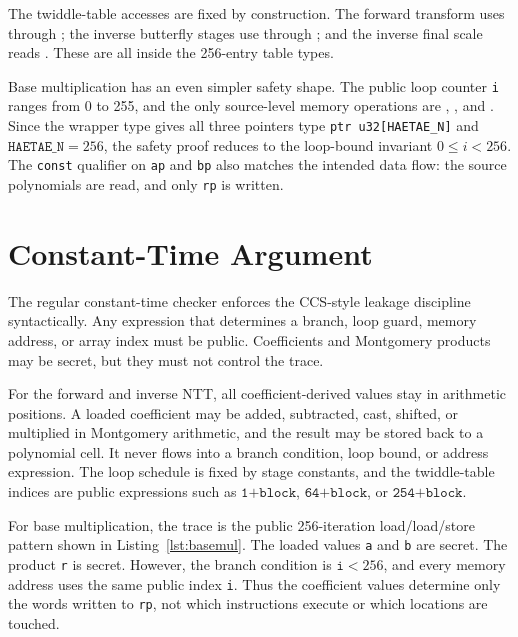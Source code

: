 \documentclass[10pt,twocolumn]{article}
\newcommand{\ct}{constant-time}
\begin{document}
The twiddle-table accesses are fixed by construction.  The forward transform
uses  through ; the inverse butterfly stages
use  through ; and the inverse final
scale reads .  These are all inside the 256-entry table
types.

Base multiplication has an even simpler safety shape.  The public loop counter
\texttt{i} ranges from 0 to 255, and the only source-level memory operations are
, , and .  Since the wrapper type gives all
three pointers type \texttt{ptr u32[HAETAE\_N]} and \(\texttt{HAETAE\_N}=256\),
the safety proof reduces to the loop-bound invariant \(0\leq i<256\).  The
\texttt{const} qualifier on \texttt{ap} and \texttt{bp} also matches the
intended data flow: the source polynomials are read, and only \texttt{rp} is
written.

\section{Constant-Time Argument}

The regular \ct{} checker enforces the CCS-style leakage discipline
syntactically.  Any expression that determines a branch, loop guard, memory
address, or array index must be public.  Coefficients and Montgomery products
may be secret, but they must not control the trace.

For the forward and inverse NTT, all coefficient-derived values stay in
arithmetic positions.  A loaded coefficient may be added, subtracted, cast,
shifted, or multiplied in Montgomery arithmetic, and the result may be stored
back to a polynomial cell.  It never flows into a branch condition, loop bound,
or address expression.  The loop schedule is fixed by stage constants, and the
twiddle-table indices are public expressions such as \(\texttt{1+block}\),
\(\texttt{64+block}\), or \(\texttt{254+block}\).

For base multiplication, the trace is the public 256-iteration load/load/store
pattern shown in Listing~\ref{lst:basemul}.  The loaded values \texttt{a} and
\texttt{b} are secret.  The product \texttt{r} is secret.  However, the branch
condition is \(\texttt{i}<256\), and every memory address uses the same public
index \texttt{i}.  Thus the coefficient values determine only the words written
to \texttt{rp}, not which instructions execute or which locations are touched.
\end{document}

